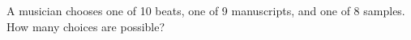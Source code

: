 A musician chooses one of 10 beats, one of 9 manuscripts, and one of 8 samples. How many choices are possible?
